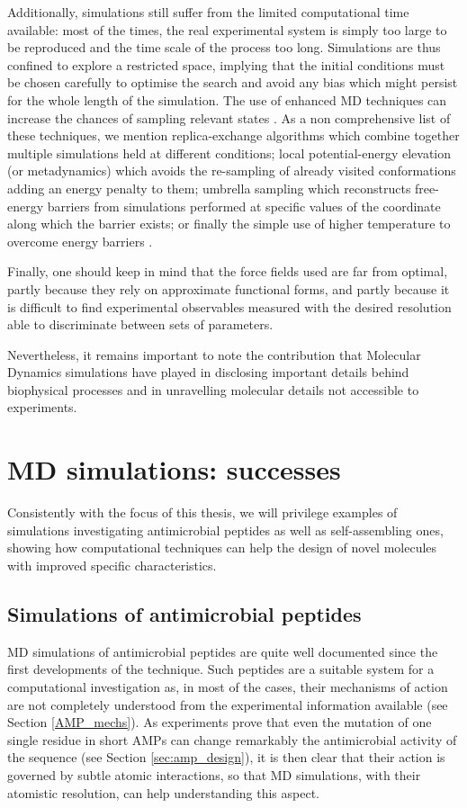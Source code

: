 Additionally, simulations still suffer from the limited computational time available: most of the times, the real experimental system is simply too large to be reproduced and the time scale of the process too long. Simulations are thus confined to explore a restricted space, implying that the initial conditions must be chosen carefully to optimise the search and avoid any bias which might persist for the whole length of the simulation. The use of enhanced MD techniques can increase the chances of sampling relevant states \citep{Bernardi2015}.
%
As a non comprehensive list of these techniques, we mention replica-exchange algorithms \citep{Best2005} which combine together multiple simulations held at different conditions; local potential-energy elevation (or metadynamics) \citep{Barducci2010,Barducci2011} which avoids the re-sampling of already visited conformations adding an energy penalty to them; umbrella sampling \citep{Mills2008} which reconstructs free-energy barriers from simulations performed at specific values of the coordinate along which the barrier exists; or finally the simple use of higher temperature to overcome energy barriers \citep{Kirkpatrick1983}.

Finally, one should keep in mind that the force fields used are far from optimal, partly because they rely on approximate functional forms, and partly because it is difficult to find experimental observables measured with the desired resolution able to discriminate between sets of parameters.

Nevertheless, it remains important to note the contribution that Molecular Dynamics simulations have played in disclosing important details behind biophysical processes and in unravelling molecular details not accessible to experiments.


\section{MD simulations: successes} \label{sec:md_lit}
Consistently with the focus of this thesis, we will privilege examples of simulations investigating antimicrobial peptides as well as self-assembling ones, showing how computational techniques can help the design of novel molecules with improved specific characteristics.

\subsection{Simulations of antimicrobial peptides}
MD simulations of antimicrobial peptides are quite well documented since the first developments of the technique. Such peptides are a suitable system for a computational investigation as, in most of the cases, their mechanisms of action are not completely understood from the experimental information available (see Section \ref{AMP_mechs}). As experiments prove that even the mutation of one single residue in short AMPs can change remarkably the antimicrobial activity of the sequence (see Section \ref{sec:amp_design}), it is then clear that their action is governed by subtle atomic interactions, so that MD simulations, with their atomistic resolution, can help understanding this aspect.

